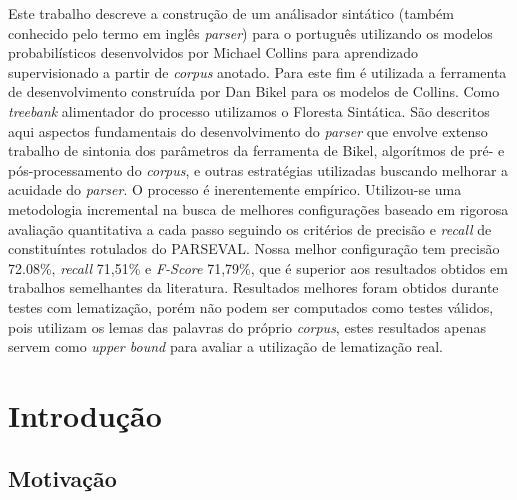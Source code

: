 \documentclass[a4paper]{abnt}
\begin{document}


\pagestyle{plain}


\begin{resumo}
Este trabalho descreve a construção de um análisador sintático (também conhecido pelo termo em inglês \emph{parser}) para o português utilizando os modelos probabilísticos desenvolvidos por Michael Collins para aprendizado supervisionado a partir de \emph{corpus} anotado. 
Para este fim é utilizada a ferramenta de desenvolvimento construída por Dan Bikel para os modelos de Collins. 
Como \emph{treebank} alimentador do processo utilizamos o Floresta Sintática.
São descritos aqui aspectos fundamentais do desenvolvimento do \emph{parser} que envolve extenso trabalho de sintonia dos parâmetros da ferramenta de Bikel, algorítmos de pré- e pós-processamento do \emph{corpus}, e outras estratégias utilizadas buscando melhorar a acuidade do \emph{parser}. 
O processo é inerentemente empírico. Utilizou-se uma metodologia incremental na busca de melhores configurações baseado em rigorosa avaliação quantitativa a cada passo seguindo os critérios de precisão e \emph{recall} de constituíntes rotulados do PARSEVAL. 
Nossa melhor configuração tem precisão 72.08{\%}, \emph{recall} 71,51{\%} e \emph{F-Score} 71,79{\%}, que é superior aos resultados obtidos em trabalhos semelhantes da literatura. Resultados melhores foram obtidos durante testes com lematização, porém não podem ser computados como testes válidos, pois utilizam os lemas das palavras do próprio \emph{corpus}, estes resultados apenas servem como \emph{upper bound} para avaliar a utilização de lematização real.

\end{resumo}

\tableofcontents
\listoffigures
\listoftables

%


\setcounter{page}{0}

\chapter{Introdução}
\label{cha:introducao}
\thispagestyle{empty}
    

\section{Motivação}
\label{sec:motivacao}
	
\end{document}
